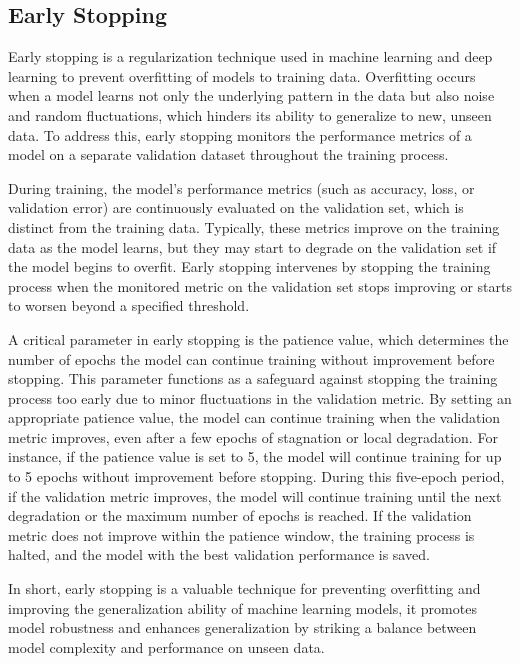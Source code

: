 \documentclass[../main.tex]{subfiles}
\begin{document}
\subsection{Early Stopping}
Early stopping is a regularization technique used in machine learning and deep learning to prevent overfitting of models to training data. 
Overfitting occurs when a model learns not only the underlying pattern in the data but also noise and random fluctuations, which hinders its ability to generalize to new, unseen data. 
To address this, early stopping monitors the performance metrics of a model on a separate validation dataset throughout the training process.

During training, the model's performance metrics (such as accuracy, loss, or validation error) are continuously evaluated on the validation set, which is distinct from the training data. 
Typically, these metrics improve on the training data as the model learns, but they may start to degrade on the validation set if the model begins to overfit. 
Early stopping intervenes by stopping the training process when the monitored metric on the validation set stops improving or starts to worsen beyond a specified threshold.

A critical parameter in early stopping is the patience value, which determines the number of epochs the model can continue training without improvement before stopping.
This parameter functions as a safeguard against stopping the training process too early due to minor fluctuations in the validation metric.
By setting an appropriate patience value, the model can continue training when the validation metric improves, even after a few epochs of stagnation or local degradation.
For instance, if the patience value is set to 5, the model will continue training for up to 5 epochs without improvement before stopping.
During this five-epoch period, if the validation metric improves, the model will continue training until the next degradation or the maximum number of epochs is reached.
If the validation metric does not improve within the patience window, the training process is halted, and the model with the best validation performance is saved.

In short, early stopping is a valuable technique for preventing overfitting and improving the generalization ability of machine learning models, it promotes model robustness and enhances generalization by striking a balance between model complexity and performance on unseen data.
\end{document}
